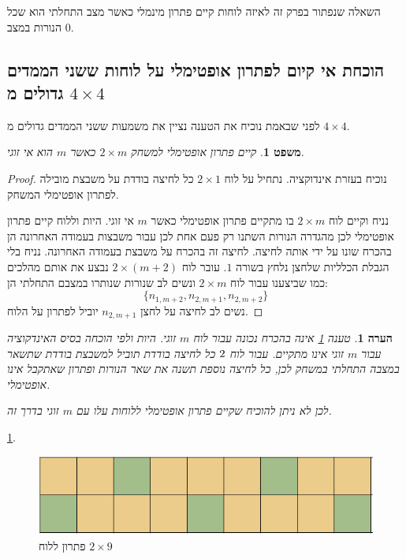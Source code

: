 \documentclass[12pt,leqno]{article}
\theoremstyle{theoremdd}
\newtheorem{theorem}{משפט}[section]
\newtheorem{comm}{הערה}[section]
\begin{document}
השאלה שנפתור בפרק זה לאיזה לוחות קיים פתרון מינמלי כאשר מצב התחלתי הוא שכל הנורות במצב
$0$.

\subsection{הוכחת אי קיום לפתרון אופטימלי על לוחות ששני הממדים גדולים מ
\texorpdfstring{$4 \times 4$}{4 x 4}}
לפני שבאמת נוכיח את הטענה 
נציין את משמעות ששני הממדים גדולים מ
$4 \times 4$.
\begin{theorem}
    \label{comm:sol to 2 x m}
    קיים פתרון אופטימלי למשחק 
    $2 \times m$
    כאשר 
    $m$
    הוא אי זוגי.
\end{theorem}
\begin{proof}
    נוכיח בעזרת אינדוקציה.
    נתחיל על לוח 
    $2 \times 1$
    כל לחיצה בודדת על משבצת מובילה לפתרון אופטימלי המשחק.
  

    נניח וקיים לוח 
    $2 \times m$
    בו מתקיים פתרון אופטימלי
    כאשר 
    $m$
    אי זוגי.
    היות וללוח קיים פתרון אופטימלי 
    לכן מהגדרה הנורות השתנו רק פעם אחת לכן 
    עבור משבצות בעמודה האחרונה 
    הן בהכרח שונו על ידי אותה לחיצה.
    לחיצה זה בהכרח על משבצת בעמודה האחרונה.
    נניח בלי הגבלת הכלליות שלחצן נלחץ בשורה 
    $1$.
    עובר לוח 
    $2 \times (m+2)$
    נבצע את אותם מהלכים כמו שביצענו עבור לוח 
    $2 \times m$
    ונשים לב 
    שנורות שנותרו במצבם התחלתי הן:
    \[ \{n_{1,m+2}, n_{2,m+1}, n_{2,m+2}\} \]
    נשים לב לחיצה על 
    לחצן 
    $n_{2,m+1}$
    יוביל לפתרון על הלוח.
\end{proof}
\begin{comm}
    טענה 
    \ref{comm:sol to 2 x m}
    אינה בהכרח נכונה עבור לוח 
    $m$
    זוגי.
    היות ולפי הוכחה בסיס האינדקוציה עבור 
    $m$
    זוגי אינו מתקיים.
    עבור לוח 
    $2 \time 2$
    כל לחיצה בודדת תוביל למשבצת בודדת שתשאר במצבה התחלתי במשחק
    לכן, כל לחיצה נוספת תשנה את שאר הנורות ופתרון שאתקבל אינו אופטימלי.

    לכן לא ניתן להוכיח שקיים פתרון אופטימלי ללוחות עלו עם 
    $m$
    זוגי בדרך זה.
\end{comm}

\ref{fig: 2x9 have min sol}.

\begin{figure}[ht]
    \caption{פתרון ללוח 
    $2 \times 9$}
    \label{fig: 2x9 have min sol}
    \centering
    \includegraphics[width=.5\textwidth,keepaspectratio]{images/2xm_sol.PNG}
\end{figure}
\end{document}
